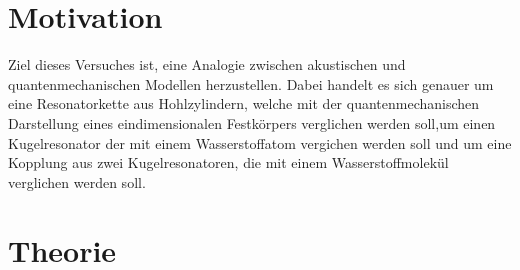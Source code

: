 \section{Motivation}
\label{sec:Motivation}
Ziel dieses Versuches ist, eine Analogie zwischen akustischen und quantenmechanischen 
Modellen herzustellen. Dabei handelt es sich genauer um eine Resonatorkette aus 
Hohlzylindern, 
welche mit der quantenmechanischen Darstellung eines eindimensionalen Festkörpers 
verglichen werden soll,um einen Kugelresonator der mit einem Wasserstoffatom 
vergichen werden soll und um eine 
Kopplung aus zwei Kugelresonatoren, die mit einem Wasserstoffmolekül verglichen werden 
soll.

\section{Theorie}
\label{sec:Theorie}

